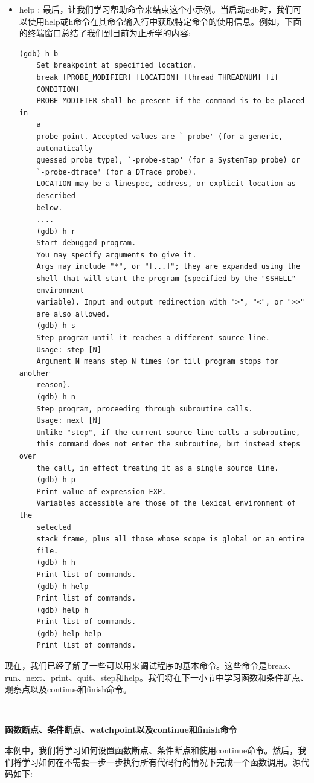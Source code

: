 \begin{itemize}
\begin{lstlisting}[caption={}]
		multiple (x=10, y=20) at ch13_gdb_1.cpp:14
		14 float s = x + y;
		(gdb) n
		15 return s;
		(gdb) p s
		$1 = 30
	\end{lstlisting}
	\item help : 最后，让我们学习帮助命令来结束这个小示例。当启动gdb时，我们可以使用help或h命令在其命令输入行中获取特定命令的使用信息。例如，下面的终端窗口总结了我们到目前为止所学的内容:
	\begin{lstlisting}[caption={}]
	(gdb) h b
	Set breakpoint at specified location.
	break [PROBE_MODIFIER] [LOCATION] [thread THREADNUM] [if
	CONDITION]
	PROBE_MODIFIER shall be present if the command is to be placed in
	a
	probe point. Accepted values are `-probe' (for a generic,
	automatically
	guessed probe type), `-probe-stap' (for a SystemTap probe) or
	`-probe-dtrace' (for a DTrace probe).
	LOCATION may be a linespec, address, or explicit location as
	described
	below.
	....
	(gdb) h r
	Start debugged program.
	You may specify arguments to give it.
	Args may include "*", or "[...]"; they are expanded using the
	shell that will start the program (specified by the "$SHELL"
	environment
	variable). Input and output redirection with ">", "<", or ">>"
	are also allowed.
	(gdb) h s
	Step program until it reaches a different source line.
	Usage: step [N]
	Argument N means step N times (or till program stops for another
	reason).
	(gdb) h n
	Step program, proceeding through subroutine calls.
	Usage: next [N]
	Unlike "step", if the current source line calls a subroutine,
	this command does not enter the subroutine, but instead steps over
	the call, in effect treating it as a single source line.
	(gdb) h p
	Print value of expression EXP.
	Variables accessible are those of the lexical environment of the
	selected
	stack frame, plus all those whose scope is global or an entire
	file.
	(gdb) h h
	Print list of commands.
	(gdb) h help
	Print list of commands.
	(gdb) help h
	Print list of commands.
	(gdb) help help
	Print list of commands.
	\end{lstlisting}
\end{itemize}

现在，我们已经了解了一些可以用来调试程序的基本命令。这些命令是break、run、next、print、quit、step和help。我们将在下一小节中学习函数和条件断点、观察点以及continue和finish命令。 \par

\noindent\textbf{}\ \par
\textbf{函数断点、条件断点、watchpoint以及continue和finish命令} \ \par
本例中，我们将学习如何设置函数断点、条件断点和使用continue命令。然后，我们将学习如何在不需要一步一步执行所有代码行的情况下完成一个函数调用。源代码如下: \par

